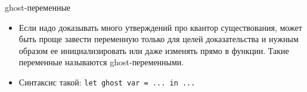 \documentclass[hyperref={unicode=true}]{beamer}
\begin{document}
    \begin{frame}{ghost-переменные}
    \begin{itemize}
    \item
    Если надо доказывать много утверждений про квантор существования,
    может быть проще завести переменную только для целей доказательства
    и нужным образом ее инициализировать или даже изменять прямо
    в функции. Такие переменные называются ghost-переменными.
    \item
    Синтаксис такой: \texttt{let ghost var = ... in ...}
    \end{itemize}
    \end{frame}
\end{document}

